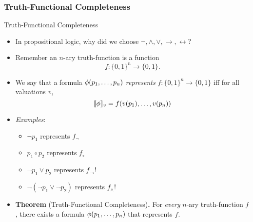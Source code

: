 \subsubsection{Truth-Functional Completeness}
\begin{frame}{Truth-Functional Completeness}

  \begin{itemize}

  \item In propositional logic, why did we choose
    $\neg,\land,\lor,\to,\leftrightarrow$?

  \item Remember an $n$-ary truth-function is a function
    \[f:\{0,1\}^n\to \{0,1\}.\] 
    
  \item We say that a formula $\phi(p_1, \mathellipsis, p_n)$
    \emph{represents} $f:\{0,1\}^n\to \{0,1\}$ iff for all valuations
    $v$, \[\llbracket \phi\rrbracket_v=f(v(p_1),\mathellipsis,
      v(p_n))\]

  \item \emph{Examples}:
    \begin{itemize}
    \item $\neg p_1$ represents $f_\neg$
    \item $p_1\circ p_2$ represents $f_\circ$
    \item $\neg p_1\lor p_2$ represents $f_\to$!
    \item $\neg (\neg p_1\lor \neg p_2)$ represents $f_\land$!
    \end{itemize}

    \item \textbf{Theorem} (Truth-Functional Completeness)\textbf{.}
      For \emph{every} $n$-ary truth-function $f$, there exists a
      formula $\phi(p_1, \mathellipsis, p_n)$ that represents $f$. 

  \end{itemize}

\end{frame}

